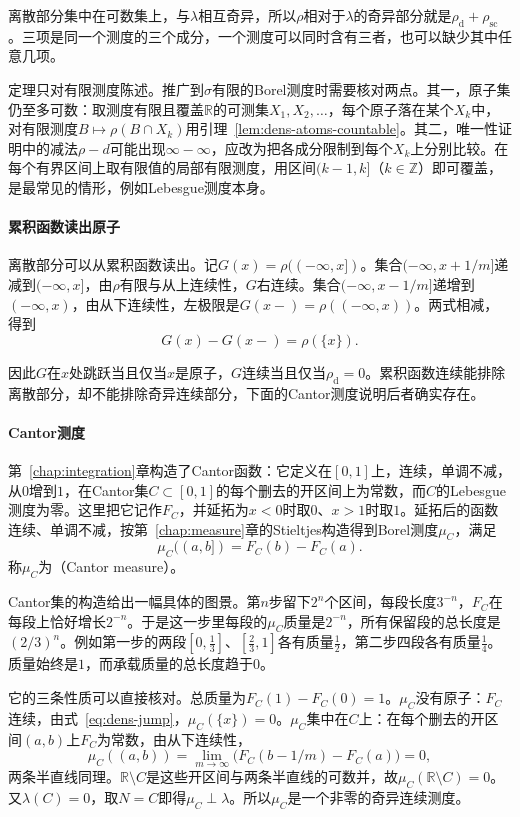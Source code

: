 离散部分集中在可数集上，与$\lambda$相互奇异，所以$\rho$相对于$\lambda$的奇异部分就是$\rho_{\mathrm d}+\rho_{\mathrm{sc}}$。三项是同一个测度的三个成分，一个测度可以同时含有三者，也可以缺少其中任意几项。

定理只对有限测度陈述。推广到$\sigma$有限的Borel测度时需要核对两点。其一，原子集仍至多可数：取测度有限且覆盖$\mathbb R$的可测集$X_1,X_2,\ldots$，每个原子落在某个$X_k$中，对有限测度$B\mapsto\rho(B\cap X_k)$用引理~\ref{lem:dens-atoms-countable}。其二，唯一性证明中的减法$\rho-d$可能出现$\infty-\infty$，应改为把各成分限制到每个$X_k$上分别比较。在每个有界区间上取有限值的局部有限测度，用区间$(k-1,k]$（$k\in\mathbb Z$）即可覆盖，是最常见的情形，例如Lebesgue测度本身。

\paragraph{累积函数读出原子}
离散部分可以从累积函数读出。记$G(x)=\rho((-\infty,x])$。集合$(-\infty,x+1/m]$递减到$(-\infty,x]$，由$\rho$有限与从上连续性，$G$右连续。集合$(-\infty,x-1/m]$递增到$(-\infty,x)$，由从下连续性，左极限是$G(x-)=\rho((-\infty,x))$。两式相减，得到
\begin{equation}
G(x)-G(x-)=\rho(\{x\}).
\label{eq:dens-jump}
\end{equation}

因此$G$在$x$处跳跃当且仅当$x$是原子，$G$连续当且仅当$\rho_{\mathrm d}=0$。累积函数连续能排除离散部分，却不能排除奇异连续部分，下面的Cantor测度说明后者确实存在。

\paragraph{Cantor测度}
第~\ref{chap:integration}章构造了Cantor函数：它定义在$[0,1]$上，连续，单调不减，从$0$增到$1$，在Cantor集$C\subset[0,1]$的每个删去的开区间上为常数，而$C$的Lebesgue测度为零。这里把它记作$F_C$，并延拓为$x<0$时取$0$、$x>1$时取$1$。延拓后的函数连续、单调不减，按第~\ref{chap:measure}章的Stieltjes构造得到Borel测度$\mu_C$，满足
\[
\mu_C((a,b])=F_C(b)-F_C(a).
\]
称$\mu_C$为（Cantor measure）。

Cantor集的构造给出一幅具体的图景。第$n$步留下$2^n$个区间，每段长度$3^{-n}$，$F_C$在每段上恰好增长$2^{-n}$。于是这一步里每段的$\mu_C$质量是$2^{-n}$，所有保留段的总长度是$(2/3)^n$。例如第一步的两段$[0,\tfrac13]$、$[\tfrac23,1]$各有质量$\tfrac12$，第二步四段各有质量$\tfrac14$。质量始终是$1$，而承载质量的总长度趋于$0$。

它的三条性质可以直接核对。总质量为$F_C(1)-F_C(0)=1$。$\mu_C$没有原子：$F_C$连续，由式~\eqref{eq:dens-jump}，$\mu_C(\{x\})=0$。$\mu_C$集中在$C$上：在每个删去的开区间$(a,b)$上$F_C$为常数，由从下连续性，
\[
\mu_C((a,b))=\lim_{m\to\infty}\bigl(F_C(b-1/m)-F_C(a)\bigr)=0 ,
\]
两条半直线同理。$\mathbb R\setminus C$是这些开区间与两条半直线的可数并，故$\mu_C(\mathbb R\setminus C)=0$。又$\lambda(C)=0$，取$N=C$即得$\mu_C\perp\lambda$。所以$\mu_C$是一个非零的奇异连续测度。

